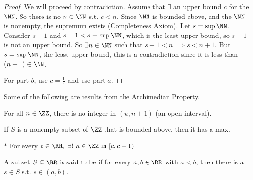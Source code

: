 \documentclass[12pt]{scrartcl}
\begin{document}
\begin{proof}
  
  We will proceed by contradiction. Assume that $\exists$ an upper bound $c$ for the 
  $\NN$. So there is no $n \in \NN$ s.t. $c < n$. Since $\NN$ is bounded above, and 
  the $\NN$ is nonempty, the supremum exists (Completeness Axiom). 
  Let $s = \sup \NN$. Consider $s - 1$ and $s - 1 < s = \sup \NN$, which is the least
  upper bound, so $s - 1$ is not an upper bound. So $\exists n \in \NN$ such that $s - 1 < n \implies 
  s < n + 1$. But $s = \sup \NN$, the least upper bound, this is a contradiction since it 
  is less than $(n + 1) \in \NN$. 
  
  For part $b$, use $c = \frac{1}{\epsilon}$ and use part $a$. 
\end{proof}

\begin{note}
  Some of the following are results from the Archimedian Property. 

  \begin{theorem}
    For all $n \in \ZZ$, there is no integer in $(n, n + 1)$ (an open interval).
  \end{theorem}

  \begin{theorem}
    If $S$ is a nonempty subset of $\ZZ$ that is bounded above, then it has a max. 
  \end{theorem}

  \begin{theorem}
    $*$ For every $c \in \RR, \ \exists ! \ n \in \ZZ \text{ in } [c, c + 1)$
  \end{theorem}

\end{note}

\begin{definition}
  A subset $S \subseteq \RR$ is said to be  if for every $a, b \in \RR$
  with $a < b$, then there is a $s \in S$ s.t. $s \in (a, b)$.
\end{definition}
\end{document}
